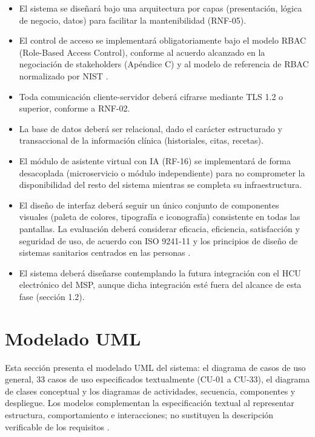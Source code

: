 \documentclass[11pt,a4paper]{article}
\providecommand{\tightlist}{%
	\setlength{\itemsep}{0pt}\setlength{\parskip}{0pt}}
\begin{document}
	\begin{itemize}
		\tightlist
		\item
		El sistema se diseñará bajo una arquitectura por capas (presentación, lógica de negocio, datos) para facilitar la mantenibilidad (RNF-05).
		\item
		El control de acceso se implementará obligatoriamente bajo el modelo RBAC (Role-Based Access Control), conforme al acuerdo alcanzado en la negociación de stakeholders (Apéndice C) y al modelo de referencia de RBAC normalizado por NIST \cite{sandhu2000,nist80053}.
		\item
		Toda comunicación cliente-servidor deberá cifrarse mediante TLS 1.2 o superior, conforme a RNF-02.
		\item
		La base de datos deberá ser relacional, dado el carácter estructurado y transaccional de la información clínica (historiales, citas, recetas).
		\item
		El módulo de asistente virtual con IA (RF-16) se implementará de forma desacoplada (microservicio o módulo independiente) para no comprometer la disponibilidad del resto del sistema mientras se completa su infraestructura.
		\item
		El diseño de interfaz deberá seguir un único conjunto de componentes visuales (paleta de colores, tipografía e iconografía) consistente en todas las pantallas. La evaluación deberá considerar eficacia, eficiencia, satisfacción y seguridad de uso, de acuerdo con ISO 9241-11 y los principios de diseño de sistemas sanitarios centrados en las personas \cite{iso9241,carayon2014}.
		\item
		El sistema deberá diseñarse contemplando la futura integración con el HCU electrónico del MSP, aunque dicha integración esté fuera del alcance de esta fase (sección 1.2).
	\end{itemize}
	
	
	
	\section{Modelado UML}
	
	Esta sección presenta el modelado UML del sistema: el diagrama de casos de uso general, 33 casos de uso especificados textualmente (CU-01 a CU-33), el diagrama de clases conceptual y los diagramas de actividades, secuencia, componentes y despliegue. Los modelos complementan la especificación textual al representar estructura, comportamiento e interacciones; no sustituyen la descripción verificable de los requisitos \cite{davis1993,pohl2010}.
	
\end{document}
